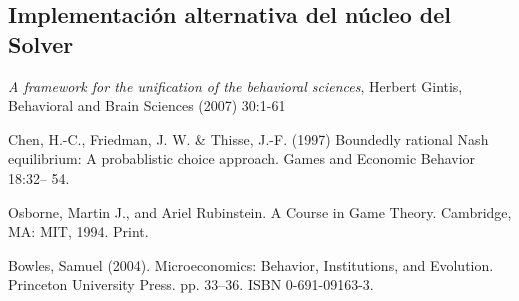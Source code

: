 \documentclass[10pt,a4paper,notitlepage,draft]{article}
\begin{document}
\subsection{Implementación alternativa del núcleo del Solver}
\begin{thebibliography}{9}
   \emph{A framework for the unification of the behavioral sciences}, Herbert Gintis, Behavioral and Brain Sciences (2007) 30:1-61

   Chen, H.-C., Friedman, J. W. \& Thisse, J.-F. (1997) Boundedly rational Nash
equilibrium: A probablistic choice approach. Games and Economic Behavior
18:32– 54.

   Osborne, Martin J., and Ariel Rubinstein. A Course in Game Theory. Cambridge, MA: MIT, 1994. Print.

   Bowles, Samuel (2004). Microeconomics: Behavior, Institutions, and Evolution. Princeton University Press. pp. 33–36. ISBN 0-691-09163-3.
\end{thebibliography}
\end{document}
